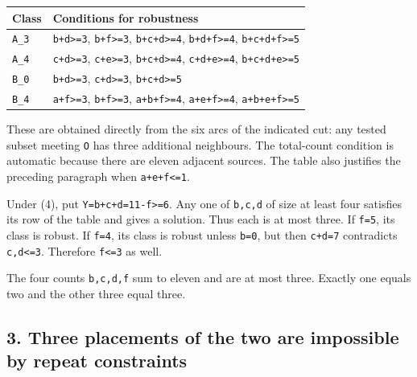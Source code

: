 \documentclass[
  10pt,
]{article}
\begin{document}
\begin{longtable}[]{@{}ll@{}}
\toprule\noalign{}
Class & Conditions for robustness \\
\midrule\noalign{}
\endhead
\bottomrule\noalign{}
\endlastfoot
\texttt{A\_3} & \texttt{b+d\textgreater{}=3},
\texttt{b+f\textgreater{}=3}, \texttt{b+c+d\textgreater{}=4},
\texttt{b+d+f\textgreater{}=4}, \texttt{b+c+d+f\textgreater{}=5} \\
\texttt{A\_4} & \texttt{c+d\textgreater{}=3},
\texttt{c+e\textgreater{}=3}, \texttt{b+c+d\textgreater{}=4},
\texttt{c+d+e\textgreater{}=4}, \texttt{b+c+d+e\textgreater{}=5} \\
\texttt{B\_0} & \texttt{b+d\textgreater{}=3},
\texttt{c+d\textgreater{}=3}, \texttt{b+c+d\textgreater{}=5} \\
\texttt{B\_4} & \texttt{a+f\textgreater{}=3},
\texttt{b+f\textgreater{}=3}, \texttt{a+b+f\textgreater{}=4},
\texttt{a+e+f\textgreater{}=4}, \texttt{a+b+e+f\textgreater{}=5} \\
\end{longtable}

These are obtained directly from the six arcs of the indicated cut: any
tested subset meeting \texttt{O} has three additional neighbours. The
total-count condition is automatic because there are eleven adjacent
sources. The table also justifies the preceding paragraph when
\texttt{a+e+f\textless{}=1}.

Under (4), put \texttt{Y=b+c+d=11-f\textgreater{}=6}. Any one of
\texttt{b,c,d} of size at least four satisfies its row of the table and
gives a solution. Thus each is at most three. If \texttt{f=5}, its class
is robust. If \texttt{f=4}, its class is robust unless \texttt{b=0}, but
then \texttt{c+d=7} contradicts \texttt{c,d\textless{}=3}. Therefore
\texttt{f\textless{}=3} as well.

The four counts \texttt{b,c,d,f} sum to eleven and are at most three.
Exactly one equals two and the other three equal three.

\hypertarget{three-placements-of-the-two-are-impossible-by-repeat-constraints}{%
\subsection*{3. Three placements of the two are impossible by repeat
constraints}\label{three-placements-of-the-two-are-impossible-by-repeat-constraints}}
\end{document}
